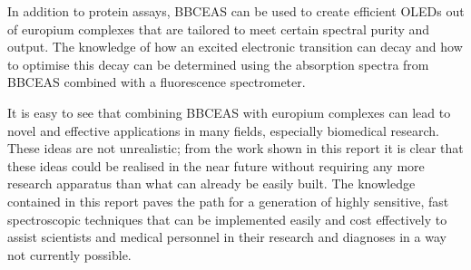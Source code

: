 In addition to protein assays, \ac{BBCEAS} can be used to create efficient
\acp{OLED} out of europium complexes that are tailored to meet certain
spectral purity and output. The knowledge of how an excited electronic
transition can decay and how to optimise this decay can be determined
using the absorption spectra from \ac{BBCEAS} combined with a fluorescence
spectrometer.

It is easy to see that combining \ac{BBCEAS} with europium complexes can lead
to novel and effective applications in many fields, especially biomedical
research. These ideas are not unrealistic; from the work shown in this report
it is clear that these ideas could be realised in the near future without
requiring any more research apparatus than what can already be easily built.
The knowledge contained in this report paves the path for a generation of
highly sensitive, fast spectroscopic techniques that can be implemented easily
and cost effectively to assist scientists and medical personnel in their
research and diagnoses in a way not currently possible.
